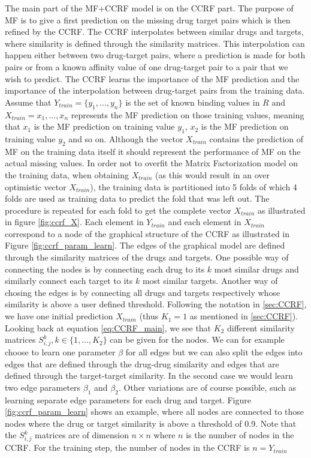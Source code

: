The main part of the MF+CCRF model is on the CCRF part. The purpose of MF is to give a first prediction on the missing drug target pairs which is then refined by the CCRF. The CCRF interpolates between similar drugs and targets, where similarity is defined through the similarity matrices. This interpolation can happen either between two drug-target pairs, where a prediction is made for both pairs or from a known affinity value of one drug-target pair to a pair that we wish to predict. The CCRF learns the importance of the MF prediction and the importance of the interpolation between drug-target pairs from the training data.
Assume that $Y_{train} = \{y_1, \dots, y_n\}$ is the set of known binding values in $R$ and $X_{train}={x_1,\dots,x_n}$ represents the MF prediction on those training values, meaning that $x_1$ is the MF prediction on training value $y_1$, $x_2$ is the MF prediction on training value $y_2$ and so on. Although the vector $X_{train}$ contains the prediction of MF on the training data itself it should represent the performance of MF on the actual missing values. In order not to overfit the Matrix Factorization model on the training data, when obtaining $X_{train}$ (as this would result in an over optimistic vector $X_{train}$), the training data is partitioned into 5 folds of which 4 folds are used as training data to predict the fold that was left out. The procedure is repeated for each fold to get the complete vector $X_{train}$ as illustrated in figure \ref{fig:ccrf_X}. Each element in $Y_{train}$ and each element in $X_{train}$ correspond to a node of the graphical structure of the CCRF as illustrated in Figure \ref{fig:ccrf_param_learn}. The edges of the graphical model are defined through the similarity matrices of the drugs and targets. One possible way of connecting the nodes is by connecting each drug to its $k$ most similar drugs and similarly connect each target to its $k$ most similar targets. Another way of chosing the edges is by connecting all drugs and targets respectively whose similarity is above a user defined threshold. Following the notation in \ref{sec:CCRF}, we have one initial prediction $X_{train}$ (thus $K_1=1$ as mentioned in \ref{sec:CCRF}). Looking back at equation \ref{eq:CCRF_main}, we see that $K_2$ different similarity matrices $S_{i,j}^k, k \in \{1,\dots,K_2\}$ can be given for the nodes. We can for example choose to learn one parameter $\beta$ for all edges but we can also split the edges into edges that are defined through the drug-drug similarity and edges that are defined through the target-target similarity. In the second case we would learn two edge parameters $\beta_1$ and $\beta_2$. Other variations are of course possible, such as learning separate edge parameters for each drug and target. Figure \ref{fig:ccrf_param_learn} shows an example, where all nodes are connected to those nodes where the drug or target similarity is above a threshold of 0.9. Note that the $S_{i,j}^k$ matrices are of dimension $n \times n$ where $n$ is the number of nodes in the CCRF. For the training step, the number of nodes in the CCRF is $n = Y_{train}$
